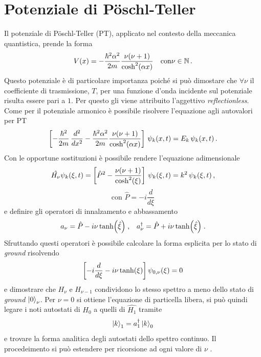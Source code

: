 \documentclass[12pt]{report}
\begin{document}
\section{Potenziale di P\"oschl-Teller}
\label{sec:RL}

Il potenziale di P\"oschl-Teller (PT), applicato nel contesto della meccanica quantistica, prende la forma 
\begin{equation}
    \centering
    V(x) = -\frac{\hbar^2 \alpha^2}{2m} \frac{\nu (\nu + 1)}{\cosh^2 (\alpha x)} \quad \text{con} \nu \in \mathbb{N} \, \text{.}
    \label{eq:pot_PT}
\end{equation}
Questo potenziale è di particolare importanza poiché si può dimostare che $\forall \nu$ il coefficiente di trasmissione, $T$, per una funzione d'onda incidente sul potenziale risulta essere pari a $1$. Per questo gli viene attribuito l'aggettivo \textsl{reflectionless}.   
Come per il potenziale armonico è possibile risolvere l'equazione agli autovalori per PT
\begin{equation}
    \centering
    \left[ - \frac{\hbar^{2}}{2m} \, \frac{d^2}{dx^2} -\frac{\hbar^2 \alpha^2}{2m} \frac{\nu (\nu + 1)}{\cosh^2 (\alpha x)}  \right] \, \psi_k (x, t) = E_k \, \psi_k (x, t) \, \text{.}
    \label{eq:einge_eq_PT}
\end{equation}
Con le opportune sostituzioni è possibile rendere l'equazione adimensionale
\begin{equation}
    \centering
    \hat{H_{\nu}} \psi_k (\xi, t) =  \left[ \hat{P}^2 - \frac{\nu (\nu + 1)}{\cosh^2 (\xi)}  \right] \, \psi_k (\xi, t) = k^2 \, \psi_k (\xi, t) \, \text{,} 
    \label{eq:PT_adim}
\end{equation}
\begin{equation}
    \text{con  } \hat{P} = -i \frac{d}{d \xi}
\end{equation}
e definire gli operatori di innalzamento e abbassamento
\begin{equation}
    \centering
    a_{\nu} = \hat{P} - i \nu \tanh(\hat{\xi}) \; \text{,} \quad  a_{\nu}^{\dagger} = \hat{P} + i \nu \tanh(\hat{\xi}) \; \text{.}
\end{equation}
Sfruttando questi operatori è possibile calcolare la forma esplicita per lo stato di \textsl{ground} risolvendo 
\begin{equation}
    \centering
    \left[-i \frac{d}{d \xi} - i \nu \tanh(\xi) \right] \psi_{0, \nu} (\xi) = 0
\end{equation}
e dimostrare che $H_{\nu}$ e $H_{\nu - 1}$ condividono lo stesso spettro a meno dello stato di \textsl{ground} $\ket{0}_{\nu}$.
Per $\nu = 0$ si ottiene l'equazione di particella libera, si può quindi legare i noti autostati di $\hat{H_0}$ a quelli di $\hat{H_1}$ tramite
\begin{equation}
    \ket{k}_1 = a_{1}^{\dagger} \ket{k}_0
    \label{eq:autostati_eq}
\end{equation}
e trovare la forma analitica degli autostati dello spettro continuo. Il procedeimento si può estendere per ricorsione ad ogni valore di $\nu$ \cite{Jaffe:RL_sol}.
\end{document}
